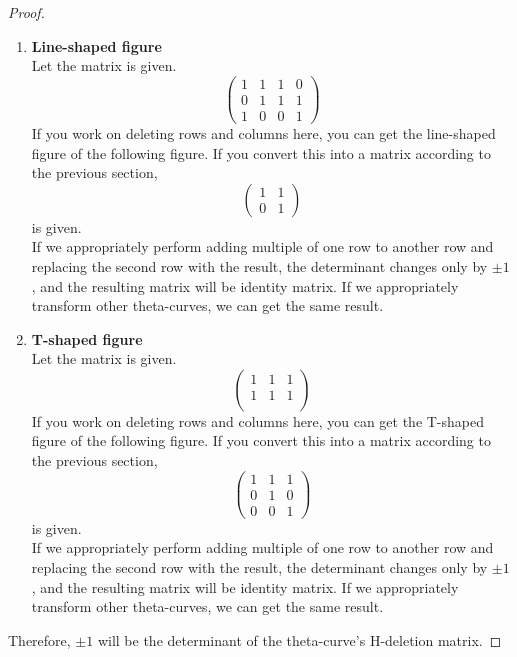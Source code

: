\documentclass{article}
\theoremstyle{definition}
\begin{document}
\begin{proof}
\begin{enumerate}
    \item \textbf{Line-shaped figure}\\
    Let the matrix is given.
    $$\begin{pmatrix}
        1 & 1 & 1 & 0\\
        0 & 1 & 1 & 1\\
        1 & 0 & 0 & 1
    \end{pmatrix}$$
    If you work on deleting rows and columns here, you can get the line-shaped figure of the following figure. If you convert this into a matrix according to the previous section,
    $$\begin{pmatrix}
        1 & 1 \\
        0 & 1
    \end{pmatrix}$$
    is given.\\
    If we appropriately perform adding multiple of one row to another row and replacing the second row with the result, the determinant changes only by $\pm 1$, and the resulting matrix will be identity matrix. If we appropriately transform other theta-curves, we can get the same result.
    \item \textbf{T-shaped figure}\\
    Let the matrix is given.
    $$\begin{pmatrix}
        1 & 1 & 1\\
        1 & 1 & 1\\
    \end{pmatrix}$$
    If you work on deleting rows and columns here, you can get the T-shaped figure of the following figure. If you convert this into a matrix according to the previous section,
    $$\begin{pmatrix}
        1 & 1 & 1\\
        0 & 1 & 0\\
        0 & 0 & 1
    \end{pmatrix}$$
    is given.\\
    If we appropriately perform adding multiple of one row to another row and replacing the second row with the result, the determinant changes only by $\pm 1$, and the resulting matrix will be identity matrix. If we appropriately transform other theta-curves, we can get the same result.
\end{enumerate}
Therefore, $\pm 1$ will be the determinant of the theta-curve's H-deletion matrix.


\end{proof}
\end{document}
